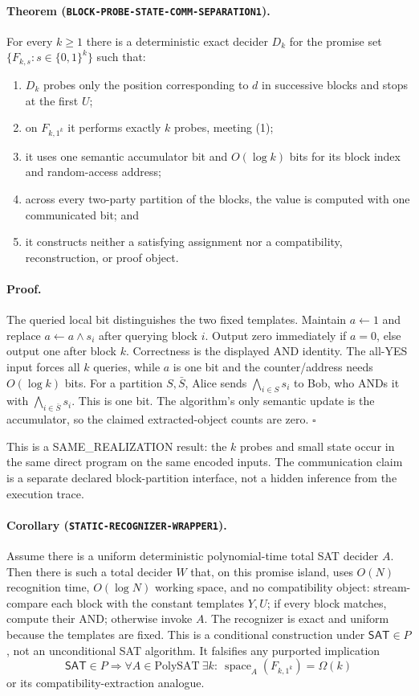 \documentclass[11pt]{article}
\newcommand{\SAT}{\mathsf{SAT}}
\begin{document}
\paragraph{Theorem (\texttt{BLOCK-PROBE-STATE-COMM-SEPARATION1}).}
For every $k\ge1$ there is a deterministic exact decider $D_k$ for the promise
set $\{F_{k,s}:s\in\{0,1\}^k\}$ such that:
\begin{enumerate}
\item $D_k$ probes only the position corresponding to $d$ in successive
blocks and stops at the first $U$;
\item on $F_{k,1^k}$ it performs exactly $k$ probes, meeting (1);
\item it uses one semantic accumulator bit and $O(\log k)$ bits for its block
index and random-access address;
\item across every two-party partition of the blocks, the value is computed
with one communicated bit; and
\item it constructs neither a satisfying assignment nor a compatibility,
reconstruction, or proof object.
\end{enumerate}

\paragraph{Proof.}
The queried local bit distinguishes the two fixed templates.  Maintain
$a\leftarrow1$ and replace $a\leftarrow a\wedge s_i$ after querying block
$i$.  Output zero immediately if $a=0$, else output one after block $k$.
Correctness is the displayed AND identity.  The all-YES input forces all $k$
queries, while $a$ is one bit and the counter/address needs $O(\log k)$ bits.
For a partition $S,\bar S$, Alice sends $\bigwedge_{i\in S}s_i$ to Bob, who
ANDs it with $\bigwedge_{i\in\bar S}s_i$.  This is one bit.  The algorithm's
only semantic update is the accumulator, so the claimed extracted-object
counts are zero. \hfill$\square$

This is a SAME\_REALIZATION result: the $k$ probes and small state occur in
the same direct program on the same encoded inputs.  The communication claim
is a separate declared block-partition interface, not a hidden inference from
the execution trace.

\paragraph{Corollary (\texttt{STATIC-RECOGNIZER-WRAPPER1}).}
Assume there is a uniform deterministic polynomial-time total SAT decider
$A$.  Then there is such a total decider $W$ that, on this promise island,
uses $O(N)$ recognition time, $O(\log N)$ working space, and no compatibility
object: stream-compare each block with the constant templates $Y,U$; if every
block matches, compute their AND; otherwise invoke $A$.  The recognizer is
exact and uniform because the templates are fixed.  This is a conditional
construction under $\SAT\in P$, not an unconditional SAT algorithm.  It
falsifies any purported implication
\[
 \SAT\in P\Longrightarrow
 \forall A\in\mathrm{PolySAT}\ \exists k:\
 \operatorname{space}_A(F_{k,1^k})=\Omega(k)
\]
or its compatibility-extraction analogue.
\end{document}
